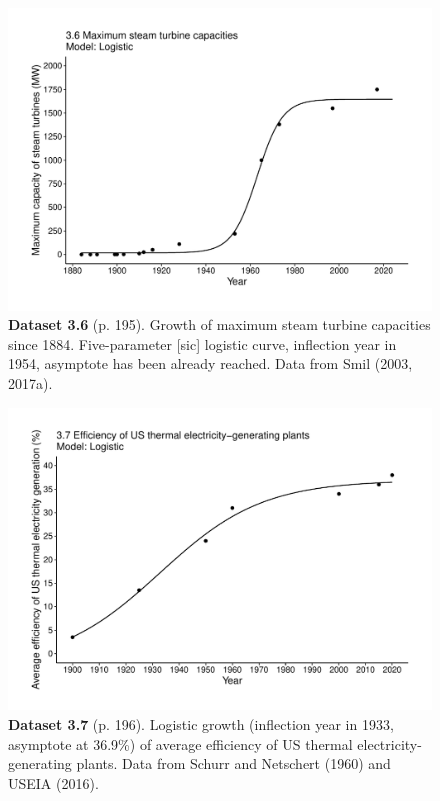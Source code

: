 \documentclass[aps,rmp,preprint,superscriptaddress,10pt,onecolumn]{article}
\begin{document}
\clearpage
\begin{figure}[h]
\includegraphics[width=\textwidth]{output/figs-ggplot/3.6.pdf}
\caption*{\textbf{Dataset 3.6} (p. 195). Growth of maximum steam turbine capacities since 1884. Five-parameter [sic] logistic curve, inflection year in 1954, asymptote has been already reached. Data from Smil (2003, 2017a).}
\end{figure}
	
\clearpage
\begin{figure}[h]
\includegraphics[width=\textwidth]{output/figs-ggplot/3.7.pdf}
\caption*{\textbf{Dataset 3.7} (p. 196). Logistic growth (inflection year in 1933, asymptote at 36.9\%) of average efficiency of US thermal electricity-generating plants. Data from Schurr and Netschert (1960) and USEIA (2016).}
\end{figure}
	
\end{document}
